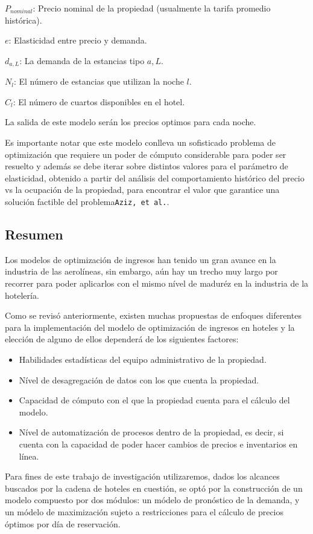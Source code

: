 {{{$P_{nominal}$: Precio nominal de la propiedad (usualmente la tarifa promedio histórica).

$e$: Elasticidad entre precio y demanda.

$d_{a,L}$: La demanda de la estancias tipo $a,L$.

$N_l$: El número de estancias que utilizan la noche $l$.

$C_l$: El número de cuartos disponibles en el hotel.

La salida de este modelo serán los precios optimos para cada noche. 

Es importante notar que este modelo conlleva un sofisticado problema de optimización que requiere un poder de cómputo considerable para poder ser resuelto y además se debe iterar sobre distintos valores para el parámetro de elasticidad, obtenido a partir del análisis del comportamiento histórico del precio vs la ocupación de la propiedad, para encontrar el valor que garantice una solución factible del problema\texttt{Aziz, et al.}.

\subsection*{Resumen}

Los modelos de optimización de ingresos han tenido un gran avance en la industria de las aerolíneas, sin embargo, aún hay un trecho muy largo por recorrer para poder aplicarlos con el mismo nível de maduréz en la industria de la hotelería.

Como se revisó anteriormente, existen muchas propuestas de enfoques diferentes para la implementación del modelo de optimización de ingresos en hoteles y la elección de alguno de ellos dependerá de los siguientes factores:
\begin{itemize}
  \item Habilidades estadísticas del equipo administrativo de la propiedad.
  \item Nível de desagregación de datos con los que cuenta la propiedad.
  \item Capacidad de cómputo con el que la propiedad cuenta para el cálculo del modelo.
  \item Nível de automatización de procesos dentro de la propiedad, es decir, si cuenta con la capacidad de poder hacer cambios de precios e inventarios en línea.
\end{itemize}

Para fines de este trabajo de investigación utilizaremos, dados los alcances buscados por la cadena de hoteles en cuestión, se optó por la construcción de un modelo  compuesto por dos módulos: un módelo de pronóstico de la demanda, y un módelo de maximización sujeto a restricciones para el cálculo de precios óptimos por día de reservación.

}}}
